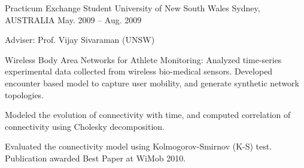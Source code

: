 \begin{cventries}
  \cventry
    {Practicum Exchange Student} %
    {University of New South Wales} %
    {Sydney, AUSTRALIA} %
    {May. 2009 -- Aug. 2009} %
    {
      \begin{cvitems} %
      \item {Adviser: Prof. Vijay Sivaraman (UNSW)}
%      
      \item {Wireless Body Area Networks for Athlete Monitoring: Analyzed time-series experimental data collected from wireless bio-medical sensors. Developed encounter based model to capture user mobility, and generate synthetic network topologies.
      		}
      \item {Modeled the evolution of connectivity with time, and computed correlation of connectivity using Cholesky decomposition.}
      \item {Evaluated the connectivity model using Kolmogorov-Smirnov (K-S) test. Publication awarded Best Paper at WiMob 2010.}
    \end{cvitems}
    }

    
\end{cventries}

